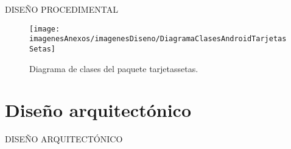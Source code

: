 DISEÑO PROCEDIMENTAL

\begin{figure}[h]
    \begin{center}%
        \begin{center}%
          \texttt{[image: imagenesAnexos/imagenesDiseno/DiagramaClasesAndroidTarjetasSetas]}%
          \caption{Diagrama de clases del paquete tarjetassetas.}%
          \label{figDiagramaClasesAndroidTarjetasSetas}%
        \end{center}%
  	\end{center}%
\end{figure}%

\newpage
\section{Diseño arquitectónico}

DISEÑO ARQUITECTÓNICO

\newpage
